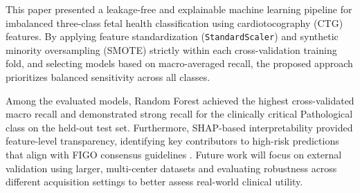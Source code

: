 \documentclass[sigconf]{acmart}
\begin{document}
This paper presented a leakage-free and explainable machine learning pipeline for imbalanced three-class fetal health classification using cardiotocography (CTG) features. By applying feature standardization (\texttt{StandardScaler}) and synthetic minority oversampling (SMOTE) strictly within each cross-validation training fold, and selecting models based on macro-averaged recall, the proposed approach prioritizes balanced sensitivity across all classes.

Among the evaluated models, Random Forest achieved the highest cross-validated macro recall and demonstrated strong recall for the clinically critical Pathological class on the held-out test set. Furthermore, SHAP-based interpretability provided feature-level transparency, identifying key contributors to high-risk predictions that align with FIGO consensus guidelines \cite{ayres2015}. Future work will focus on external validation using larger, multi-center datasets and evaluating robustness across different acquisition settings to better assess real-world clinical utility.

\clearpage  


\end{document}
